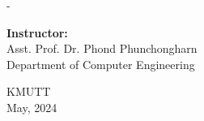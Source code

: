 \begin{titlingpage}
\begin{SingleSpace}
\begin{adjustwidth*}{\unitlength}{-\unitlength}
\begin{center}
\vspace{8mm}
{\large \textbf{Instructor:} }\\
\vspace{3mm}
{\large{Asst. Prof. Dr. Phond Phunchongharn}}\\
{\large {Department of Computer Engineering}}\\
\vspace{8mm}

{\large KMUTT}\\
{\large May, 2024}\\
\end{center}
\end{adjustwidth*}
\end{SingleSpace}
\end{titlingpage}